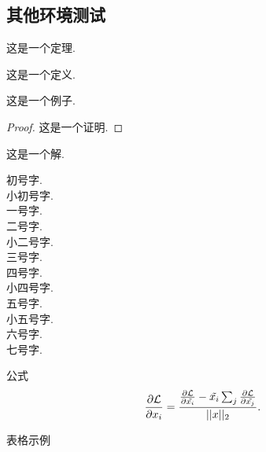 \subsection{其他环境测试}
\begin{theorem} {这是一个定理.}
\end{theorem}
\begin{definition} {这是一个定义.}
\end{definition}
\begin{exam} {这是一个例子.}
\end{exam}
\begin{proof} {这是一个证明.}
\end{proof}
\begin{solution} {这是一个解.}
\end{solution}
{\chuhao 初号字.}\\
{\xiaochuhao 小初号字.}\\
{\yihao 一号字.}\\
{\erhao 二号字.}\\
{\xiaoerhao 小二号字.}\\
{\sanhao 三号字.}\\
{\sihao 四号字.}\\
{\xiaosihao 小四号字.}\\
{\wuhao 五号字.}\\
{\xiaowuhao 小五号字.}\\
{\liuhao 六号字.}\\
{\qihao 七号字.}\\
\par 公式
\begin{equation}
    \frac{\partial\mathcal{L}}{\partial x_i}=\frac{\frac{\partial\mathcal{L}}{\partial \Tilde{x_i}}-\Tilde{x_{i}}\sum_{j}\frac{\partial\mathcal{L}}{\partial \Tilde{x_j}}}{||x||_{2}}.\ 
\end{equation}
\newpage
\par 表格示例
\renewcommand{\arraystretch}{1.5} %
